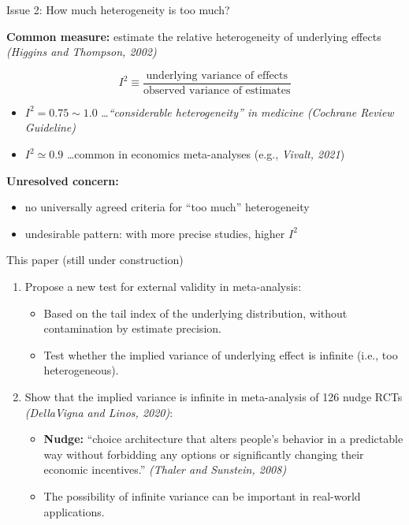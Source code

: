 \documentclass{beamer} %
\begin{document}
\begin{frame}{Issue 2: How much heterogeneity is too much?}
    
    \textbf{Common measure:} estimate the relative heterogeneity of underlying effects \textit{(Higgins and Thompson, 2002)}
    
    \[
    I^2 \equiv \frac{\text{underlying variance of effects}}{\text{observed variance of estimates}}
    \]
    
    \begin{itemize}
        \item $I^2 = 0.75 \sim 1.0$ \dots \textit{``considerable heterogeneity'' in medicine (Cochrane Review Guideline)}
        \item $I^2 \simeq 0.9$ \dots common in economics meta-analyses (e.g., \textit{Vivalt, 2021})
    \end{itemize}
    
    \bigskip
    
    \textbf{Unresolved concern:}
    \begin{itemize}
        \item no universally agreed criteria for ``too much'' heterogeneity
        \item undesirable pattern: with more precise studies, higher $I^2$
    \end{itemize}
\end{frame}


\begin{frame}{This paper (still under construction)}
    \begin{enumerate}
        \item Propose a new test for external validity in meta-analysis:
        \begin{itemize}
            \item Based on the tail index of the underlying distribution, without contamination by estimate precision.
            \item Test whether the implied variance of underlying effect is infinite (i.e., too heterogeneous).
        \end{itemize}
        
        \bigskip
        
        \item Show that the implied variance is infinite in meta-analysis of 126 nudge RCTs \textit{(DellaVigna and Linos, 2020)}:
        \begin{itemize}
            \item \textbf{Nudge:} ``choice architecture that alters people's behavior in a predictable way without forbidding any options or significantly changing their economic incentives.'' \textit{(Thaler and Sunstein, 2008)}
            \item The possibility of infinite variance can be important in real-world applications.
        \end{itemize}
    \end{enumerate}
\end{frame}
\end{document}
